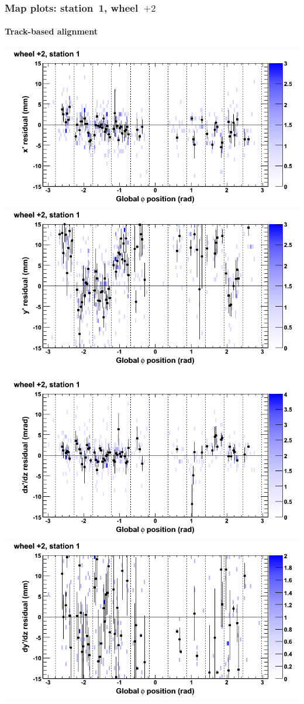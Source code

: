 \documentclass[compress]{beamer}
\begin{document}
\begin{frame}
\frametitle{Map plots: station~1, wheel~$+2$}
\framesubtitle{Track-based alignment}
\includegraphics[width=0.5\linewidth]{mapplots_re05/DTvsphi_st1whE_x.png}
\includegraphics[width=0.5\linewidth]{mapplots_re05/DTvsphi_st1whE_y.png}

\includegraphics[width=0.5\linewidth]{mapplots_re05/DTvsphi_st1whE_dxdz.png}
\includegraphics[width=0.5\linewidth]{mapplots_re05/DTvsphi_st1whE_dydz.png}
\end{frame}
\end{document}
